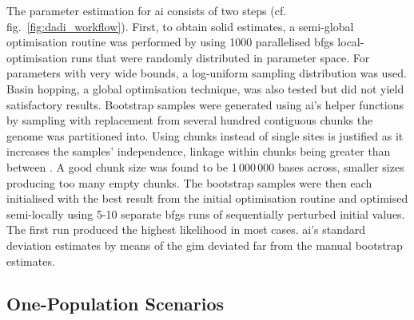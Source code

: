 \documentclass[hidelinks,11pt]{article}
\newcommand{\dadi}{\textdelta a\textdelta i}
\begin{document}
    The parameter estimation for \dadi{} consists of two steps (cf. fig.~\ref{fig:dadi_workflow}). First, to obtain solid estimates, a semi-global optimisation routine was performed by using 1000 parallelised \acrshort{bfgs} local-optimisation runs that were randomly distributed in parameter space. For parameters with very wide bounds, a log-uniform sampling distribution was used. Basin hopping, a global optimisation technique, was also tested but did not yield satisfactory results. Bootstrap samples were generated using \dadi{}'s helper functions by sampling with replacement from several hundred contiguous chunks the genome was partitioned into. Using chunks instead of single sites is justified as it increases the samples' independence, linkage within chunks being greater than between \cite{dadi-docs}. A good chunk size was found to be 1\,000\,000 bases across, smaller sizes producing too many empty chunks. The bootstrap samples were then each initialised with the best result from the initial optimisation routine and optimised semi-locally using 5-10 separate \acrshort{bfgs} runs of sequentially perturbed initial values. The first run produced the highest likelihood in most cases. \dadi{}'s standard deviation estimates by means of the \acrlong{gim} deviated far from the manual bootstrap estimates.

    \subsection{One-Population Scenarios}
\end{document}
